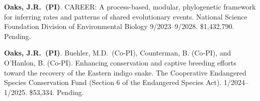 \myHangIndent
\textbf{Oaks, J.R.\ (PI)}.
CAREER: A process-based, modular, phylogenetic framework for inferring rates
and patterns of shared evolutionary events.
National Science Foundation Division of Environmental Biology
9/2023--9/2028.
\$1,432,790.
Pending.

\myHangIndent
\textbf{Oaks, J.R.\ (PI)}.
\phdsymbol{}Buehler, M.D.\ (Co-PI),
Counterman, B. (Co-PI),
and
O'Hanlon, B. (Co-PI).
Enhancing conservation and captive breeding efforts toward the recovery of the Eastern indigo snake.
The Cooperative Endangered Species Conservation Fund (Section 6 of the
Endangered Species Act).
1/2024--1/2025.
\$53,334.
Pending.
